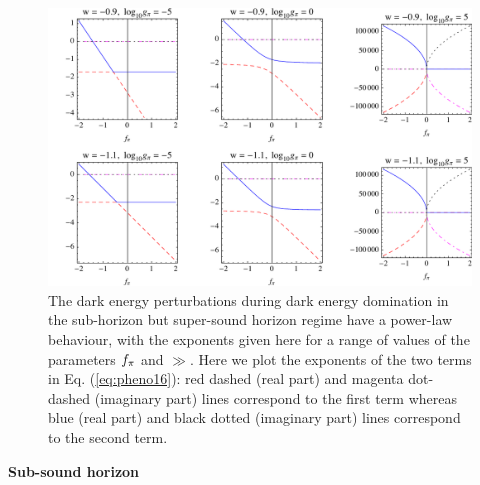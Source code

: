 \begin{figure}[tb]
\centering
\includegraphics[width=\textwidth]{figures/chapter-ade/expogrid3.pdf}
\caption{The dark energy perturbations during dark energy domination in the sub-horizon but super-sound horizon regime have a power-law behaviour,
with the exponents given here for a range of values of the parameters $f_\pi$ and $\gg$. Here we plot the exponents of the two terms in Eq. (\ref{eq:pheno16}): red dashed (real part) and magenta dot-dashed (imaginary part) lines correspond to the first term whereas blue (real part) and black dotted (imaginary part) lines correspond to the second term.}
\label{fig:expogrid3}
\end{figure}

\noindent\textbf{Sub-sound horizon}\\


